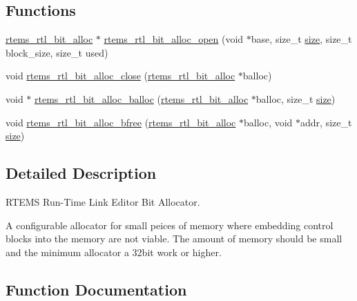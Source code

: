 \subsection*{Functions}
\begin{DoxyCompactItemize}
\item 
\mbox{\hyperlink{structrtems__rtl__bit__alloc}{rtems\+\_\+rtl\+\_\+bit\+\_\+alloc}} $\ast$ \mbox{\hyperlink{rtl-bit-alloc_8c_a68fb715e86083d53b06b7381b4f0645b}{rtems\+\_\+rtl\+\_\+bit\+\_\+alloc\+\_\+open}} (void $\ast$base, size\+\_\+t \mbox{\hyperlink{sun4u_2tte_8h_a245260f6f74972558f61b85227df5aae}{size}}, size\+\_\+t block\+\_\+size, size\+\_\+t used)
\item 
void \mbox{\hyperlink{rtl-bit-alloc_8c_ae20e516fc07b19dc0d56f5ed4a83e677}{rtems\+\_\+rtl\+\_\+bit\+\_\+alloc\+\_\+close}} (\mbox{\hyperlink{structrtems__rtl__bit__alloc}{rtems\+\_\+rtl\+\_\+bit\+\_\+alloc}} $\ast$balloc)
\item 
void $\ast$ \mbox{\hyperlink{rtl-bit-alloc_8c_a4efbf95039225f1c361636877a9df6b3}{rtems\+\_\+rtl\+\_\+bit\+\_\+alloc\+\_\+balloc}} (\mbox{\hyperlink{structrtems__rtl__bit__alloc}{rtems\+\_\+rtl\+\_\+bit\+\_\+alloc}} $\ast$balloc, size\+\_\+t \mbox{\hyperlink{sun4u_2tte_8h_a245260f6f74972558f61b85227df5aae}{size}})
\item 
void \mbox{\hyperlink{rtl-bit-alloc_8c_aa895314e00bf91d5561c34e032f3ff58}{rtems\+\_\+rtl\+\_\+bit\+\_\+alloc\+\_\+bfree}} (\mbox{\hyperlink{structrtems__rtl__bit__alloc}{rtems\+\_\+rtl\+\_\+bit\+\_\+alloc}} $\ast$balloc, void $\ast$addr, size\+\_\+t \mbox{\hyperlink{sun4u_2tte_8h_a245260f6f74972558f61b85227df5aae}{size}})
\end{DoxyCompactItemize}


\subsection{Detailed Description}
R\+T\+E\+MS Run-\/\+Time Link Editor Bit Allocator. 

A configurable allocator for small peices of memory where embedding control blocks into the memory are not viable. The amount of memory should be small and the minimum allocator a 32bit work or higher. 

\subsection{Function Documentation}
\mbox{\label{rtl-bit-alloc_8c_a4efbf95039225f1c361636877a9df6b3}} 
